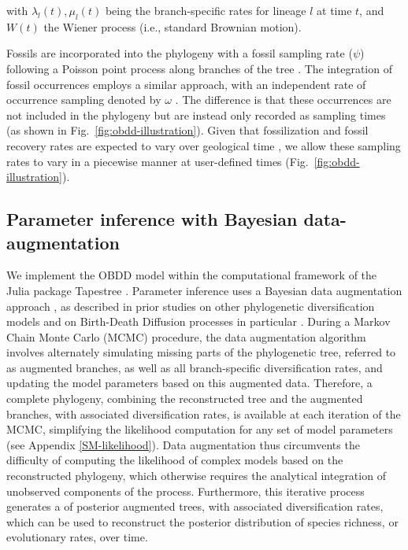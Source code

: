\documentclass[oupdraft]{sysbio}
\begin{document}
with $\lambda_l(t), \mu_l(t)$ being the branch-specific rates for lineage $l$ at time $t$, and $W(t)$ the Wiener process (i.e., standard Brownian motion).

Fossils are incorporated into the phylogeny with a fossil sampling rate ($\psi$) following a Poisson point process along branches of the tree \citep{stadler_sampling-through-time_2010, heath_fossilized_2014}. The integration of fossil occurrences employs a similar approach, with an independent rate of occurrence sampling denoted by $\omega$ \citep{vaughan_estimating_2019}. The difference is that these occurrences are not included in the phylogeny but are instead only recorded as sampling times (as shown in Fig.~\ref{fig:obdd-illustration}). Given that fossilization and fossil recovery rates are expected to vary over geological time \citep{dominici_awkward_2020}, we allow these sampling rates to vary in a piecewise manner at user-defined times (Fig.~\ref{fig:obdd-illustration}).

\subsection{Parameter inference with Bayesian data-augmentation}

We implement the OBDD model within the computational framework of the Julia package Tapestree \citep{bezanson_julia_2017, quintero_tapestreejl_2020}. Parameter inference uses a Bayesian data augmentation approach \citep{tanner_calculation_1987}, as described in prior studies on other phylogenetic diversification models \citep{maliet_fast_2022, barido-sottani_clads_2023} and on Birth-Death Diffusion processes in particular \citep{quintero_imbalanced_2024, quintero_rise_2025}. During a Markov Chain Monte Carlo (MCMC) procedure, the data augmentation algorithm involves alternately simulating missing parts of the phylogenetic tree, referred to as augmented branches, as well as all branch-specific diversification rates, and updating the model parameters based on this augmented data. Therefore, a complete phylogeny, combining the reconstructed tree and the augmented branches, with associated diversification rates, is available at each iteration of the MCMC, simplifying the likelihood computation for any set of model parameters (see Appendix \ref{SM-likelihood}). Data augmentation thus circumvents the difficulty of computing the likelihood of complex models based on the reconstructed phylogeny, which otherwise requires the analytical integration of unobserved components of the process. Furthermore, this iterative process generates a  of posterior augmented trees, with associated diversification rates, which can be used to reconstruct the posterior distribution of species richness, or evolutionary rates, over time.
\end{document}
